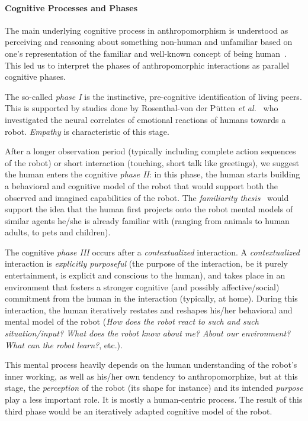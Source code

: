 \documentclass{sig-alternate-2013}
\begin{document}
\paragraph*{Cognitive Processes and Phases}

The main underlying cognitive process in anthropomorphism is understood as
perceiving and reasoning about something non-human and unfamiliar based on
one's representation of the familiar and well-known concept of being
human~\cite{epley_when_2008}. This led us to interpret the phases of
anthropomorphic interactions as parallel cognitive phases.

The so-called \emph{phase I} is the instinctive, pre-cognitive identification
of living peers. This is supported by studies done by Rosenthal-von der Pütten
\textit{et al.}~\cite{rosenthal-vonderputten_experimental_2013} who
investigated the neural correlates of emotional reactions of humans towards a
robot. {\it Empathy} is characteristic of this stage.

After a longer observation period (typically including complete action
sequences of the robot) or short interaction (touching, short talk like
greetings), we suggest the human enters the cognitive \emph{phase II}: in this
phase, the human starts building a behavioral and cognitive model of the robot
that would support both the observed and imagined capabilities of the robot.
The \emph{familiarity thesis}~\cite{hegel_understanding_2008} would support the
idea that the human first projects onto the robot mental models of similar
agents he/she is already familiar with (ranging from animals to human adults,
to pets and children).

The cognitive \emph{phase III} occurs after a \emph{contextualized}
interaction. A \emph{contextualized} interaction is \emph{explicitly
purposeful} (the purpose of the interaction, be it purely entertainment, is
explicit and conscious to the human), and takes place in an environment that
fosters a stronger cognitive (and possibly affective/social) commitment from
the human in the interaction (typically, at home). During this interaction, the
human iteratively restates and reshapes his/her behavioral and mental model of
the robot (\emph{How does the robot react to such and such situation/input?
What does the robot know about me? About our environment? What
can the robot learn?}, etc.).

This mental process heavily depends on the human understanding of the robot's
inner working, as well as his/her own tendency to anthropomorphize, but at this
stage, the \emph{perception} of the robot (its shape for instance) and its
intended \emph{purpose} play a less important role. It is mostly a
human-centric process.  The result of this third phase would be an iteratively
adapted cognitive model of the robot.
\end{document}
